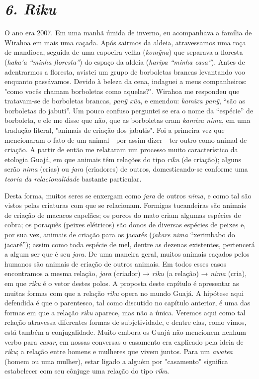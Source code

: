 
\chapter{\emph{6. Riku}}\label{riku}

O ano era 2007. Em uma manhã úmida de inverno, eu acompanhava a família
de Wirahoa em mais uma caçada. Após sairmos da aldeia, atravessamos uma
roça de mandioca, seguida de uma capoeira velha (\emph{komỹna}) que
separava a floresta (\emph{haka'a ``minha floresta''}) do espaço da
aldeia (\emph{haripa ``minha casa''}). Antes de adentrarmos a floresta,
avistei um grupo de borboletas brancas levantando voo enquanto
passávamos. Devido à beleza da cena, indaguei a meus companheiros: "como
vocês chamam borboletas como aquelas?". Wirahoa me respondeu que
tratavam-se de borboletas brancas, \emph{panỹ xũa}, e emendou:
\emph{kamixa panỹ}, ``são as borboletas do jabuti''. Um pouco confuso
perguntei se era o nome da ``espécie'' de borboleta, e ele me disse que
não, que as borboletas eram \emph{kamixa nima}, em uma tradução literal,
"animais de criação dos jabutis". Foi a primeira vez que mencionaram o
fato de um animal - por assim dizer - ter outro como animal de criação.
A partir de então me relataram um processo muito característico da
etologia Guajá, em que animais têm relações do tipo \emph{riku} (de
criação); alguns serão \emph{nima} (crias) ou \emph{jara} (criadores) de
outros, domesticando-se conforme uma \emph{teoria da relacionalidade}
bastante particular.

Desta forma, muitos seres se enxergam como \emph{jara} de outros
\emph{nima}, e como tal são vistos pelas criaturas com que se
relacionam. Formigas tucandeiras são animais de criação de macacos
capelães; os porcos do mato criam algumas espécies de cobra; os poraquês
(peixes elétricos) são donos de diversas espécies de peixes e, por sua
vez, animais de criação para os jacarés (\emph{jakare} \emph{nima}
``xerimbabo do jacaré''); assim como toda espécie de mel, dentre as
dezenas existentes, pertencerá a algum ser que é seu \emph{jara}. De uma
maneira geral, muitos animais caçados pelos humanos são animais de
criação de outros animais. Em todos esses casos encontramos a mesma
relação, \emph{jara} (criador) → \emph{riku} (a relação) → \emph{nima}
(cria), em que \emph{riku} é o vetor destes polos. A proposta deste
capítulo é apresentar as muitas formas com que a relação \emph{riku}
opera no mundo Guajá. A hipótese aqui defendida é que o parentesco, tal
como discutido no capítulo anterior, é uma das formas em que a relação
\emph{riku} aparece, mas não a única. Veremos aqui como tal relação
atravessa diferentes formas de subjetividade, e dentre elas, como vimos,
está também a conjugalidade. Muito embora os Guajá não mencionem nenhum
verbo para \emph{casar}, em nossas conversas o casamento era explicado
pela ideia de \emph{riku}; a relação entre homens e mulheres que vivem
juntos. Para um \emph{awatea} (homem ou uma mulher), estar ligado a
alguém por "casamento" significa estabelecer com seu cônjuge uma relação
do tipo \emph{riku}.

